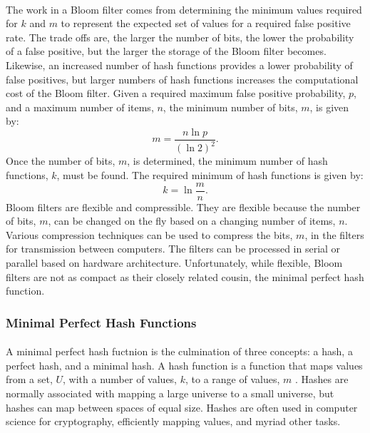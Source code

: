			\paragraph{}The work in a Bloom filter comes from determining the minimum values required for $k$ and $m$ to represent the expected set of values for a required false positive rate. The trade offs are, the larger the number of bits, the lower the probability of a false positive, but the larger the storage of the Bloom filter becomes.  Likewise, an increased number of hash functions provides a lower probability of false positives, but larger numbers of hash functions increases the computational cost of the Bloom filter.  Given a required maximum false positive probability, $p$, and a maximum number of items, $n$, the minimum number of bits, $m$,  is given by:
			\begin{equation}m = \frac{n \ln{p}}{(\ln{2})^2}.\end{equation}
			Once the number of bits, $m$, is determined, the minimum number of hash functions, $k$, must be found.  The required minimum of hash functions is given by:
			\begin{equation} k = \ln{\frac{m}{n}}.\end{equation}
			Bloom filters are flexible and compressible.  They are flexible because the number of bits, $m$, can be changed on the fly based on a changing number of items, $n$.  Various compression techniques can be used to compress the bits, $m$, in the filters for transmission between computers.  The filters can be processed in serial or parallel based on hardware architecture.  Unfortunately, while flexible, Bloom filters are not as compact as their closely related cousin, the minimal perfect hash function.

		\subsubsection{Minimal Perfect Hash Functions}
			\paragraph{} A minimal perfect hash fuctnion is the culmination of three concepts: a hash, a perfect hash, and a minimal hash. A hash function is a function that maps values from a set, $U$, with a number of values, $k$, to a range of values, $m$ \cite{belazzougui_hash_2009}. Hashes are normally associated with mapping a large universe to a small universe, but hashes can map between spaces of equal size. Hashes are often used in computer science for cryptography, efficiently mapping values, and myriad other tasks. 
